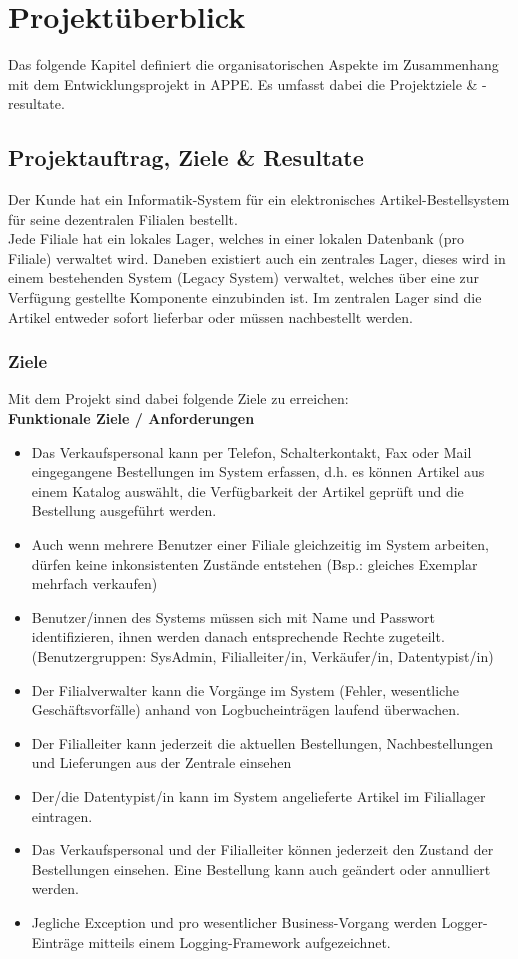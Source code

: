 \section{Projektüberblick}
Das folgende Kapitel definiert die organisatorischen Aspekte im Zusammenhang mit dem Entwicklungsprojekt in APPE. Es umfasst dabei die Projektziele \& -resultate.
\subsection{Projektauftrag, Ziele \& Resultate}
Der Kunde hat ein Informatik-System für ein elektronisches Artikel-Bestellsystem für seine dezentralen Filialen bestellt.\\
Jede Filiale hat ein lokales Lager, welches in einer lokalen Datenbank (pro Filiale) verwaltet wird. Daneben existiert auch ein zentrales Lager, dieses wird in einem bestehenden System (Legacy System) verwaltet, welches über eine zur Verfügung gestellte Komponente einzubinden ist. Im zentralen Lager sind die Artikel entweder sofort lieferbar oder müssen nachbestellt werden.
\subsubsection{Ziele}
Mit dem Projekt sind dabei folgende Ziele zu erreichen:\\
\textbf{Funktionale Ziele / Anforderungen}
\begin{itemize}
\item Das Verkaufspersonal kann per Telefon, Schalterkontakt, Fax oder Mail eingegangene Bestellungen im System erfassen, d.h. es können Artikel aus einem Katalog auswählt, die Verfügbarkeit der Artikel geprüft und die Bestellung ausgeführt werden.
\item Auch wenn mehrere Benutzer einer Filiale gleichzeitig im System arbeiten, dürfen keine inkonsistenten Zustände entstehen (Bsp.: gleiches Exemplar mehrfach verkaufen)
\item Benutzer/innen des Systems müssen sich mit Name und Passwort identifizieren, ihnen werden danach entsprechende Rechte zugeteilt. (Benutzergruppen: SysAdmin, Filialleiter/in, Verkäufer/in, Datentypist/in)
\item Der Filialverwalter kann die Vorgänge im System (Fehler, wesentliche Geschäftsvorfälle) anhand von Logbucheinträgen laufend überwachen.
\item Der Filialleiter kann jederzeit die aktuellen Bestellungen, Nachbestellungen und Lieferungen aus der Zentrale einsehen
\item Der/die Datentypist/in kann im System angelieferte Artikel im Filiallager eintragen.
\item Das Verkaufspersonal und der Filialleiter können jederzeit den Zustand der Bestellungen einsehen. Eine Bestellung kann auch geändert oder annulliert werden.
\item Jegliche Exception und pro wesentlicher Business-Vorgang werden Logger-Einträge mitteils einem Logging-Framework aufgezeichnet.
\end{itemize}

